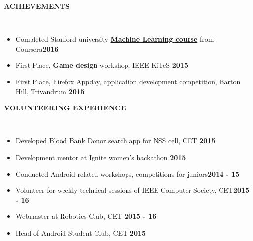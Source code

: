 \documentclass[a4paper,10pt]{article}
\newcommand{\lsep}{-0.5cm}
\newcommand{\resheading}[1]{{\small \colorbox{mygrey}{\begin{minipage}{0.975\textwidth}{\textbf{\uppercase{#1} \vphantom{p\^{E}}}}\end{minipage}}}}
\newcommand{\when}[1]{\hfill \textbf{#1}}
\newenvironment{noSepItemize}
{ \begin{itemize}
    \setlength{\itemsep}{1pt}
    \setlength{\parskip}{0pt}
    \setlength{\parsep}{0pt}     }
{ \end{itemize}                  }
\begin{document}
\resheading{\textbf{Achievements} }\\[\lsep]
\begin{noSepItemize}
	\item \noindent Completed Stanford university \textbf{\href{https://www.coursera.org/account/accomplishments/records/EJQWCKEBUSBD}{Machine Learning course}} from Coursera\when{2016}
	\item \noindent First Place, \textbf{Game design} workshop, IEEE KiTeS \when{2015}
	\item \noindent First Place, Firefox Appday, application development competition, Barton Hill, Trivandrum \when{2015}
\end{noSepItemize}

\resheading{\textbf{Volunteering Experience} }\\[\lsep]
\begin{noSepItemize}
	\item \noindent Developed Blood Bank Donor search app for NSS cell, CET \when{2015}
	\item \noindent Development mentor at Ignite women's hackathon \when{2015}
	\item \noindent Conducted Android related workshops, competitions for juniors\when{2014 - 15}
	\item \noindent Volunteer for weekly technical sessions of IEEE Computer Society, CET\when{2015 - 16}
	\item \noindent Webmaster at Robotics Club, CET \when{2015 - 16}
	\item \noindent Head of Android Student Club, CET \when{2015}
\end{noSepItemize}

\end{document}
